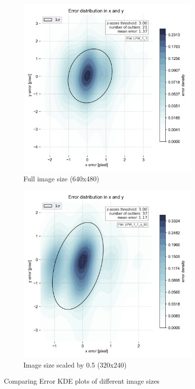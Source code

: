 \begin{figure}[h]
    \centering
    \begin{subfigure}{0.49\textwidth}
        \centering
        \includegraphics[width=\textwidth]{plots/LPW_1_1pre.png}
        \caption{Full image size (640x480)}
        \label{fig:full_scale}
    \end{subfigure}
    \begin{subfigure}{0.49\textwidth}
        \centering
        \includegraphics[width=\textwidth]{plots/LPW_1_1_s_50.png}
        \caption{Image size scaled by 0.5 (320x240)}
        \label{fig:halfscale}
    \end{subfigure}
    \caption{Comparing Error KDE plots of different image sizes}
    \label{fig:comp_e_size}
\end{figure}
